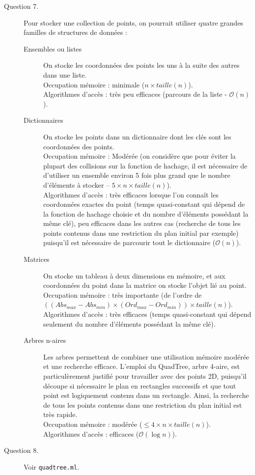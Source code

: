 \documentclass[11pt]{scrartcl}
\newcommand{\filename}[1]{\texttt{\textcolor{darkbrown}{#1}}}
\begin{document}
\begin{description}
\item[Question 7.] Pour stocker une collection de points, on pourrait utiliser quatre grandes familles de structures de données :
\begin{description}
\item[Ensembles ou listes] On stocke les coordonnées des points les uns à la suite des autres dans une liste.\\
Occupation mémoire : minimale ($n \times taille(n)$).\\
Algorithmes d'accès : très peu efficaces (parcours de la liste - $\mathcal{O}(n)$).
\item[Dictionnaires] On stocke les points dans un dictionnaire dont les clés sont les coordonnées des points.\\
Occupation mémoire : Modérée (on considère que pour éviter la plupart des collisions sur la fonction de hachage, il est nécessaire de d'utiliser un ensemble environ 5 fois plus grand que le nombre d'éléments à stocker -- $5 \times n \times taille(n)$).\\
Algorithmes d'accès : très efficaces lorsque l'on connaît les coordonnées exactes du point (temps quasi-constant qui dépend de la fonction de hachage choisie et du nombre d'éléments possédant la même clé), peu efficaces dans les autres cas (recherche de tous les points contenus dans une restriction du plan initial par exemple) puisqu'il est nécessaire de parcourir tout le dictionnaire ($\mathcal{O}(n)$).
\item[Matrices] On stocke un tableau à deux dimensions en mémoire, et aux coordonnées du point dans la matrice on stocke l'objet lié au point.\\
Occupation mémoire : très importante (de l'ordre de $((Abs_{max} - Abs_{min}) \times (Ord_{max} - Ord_{min})) \times taille(n)$).\\
Algorithmes d'accès : très efficaces (temps quasi-constant qui dépend seulement du nombre d'éléments possédant la même clé).
\item[Arbres n-aires] Les arbres permettent de combiner une utilisation mémoire modérée et une recherche efficace. L'emploi du QuadTree, arbre 4-aire, est particulèrement justifié pour travailler avec des points 2D, puisqu'il découpe si nécessaire le plan en rectangles successifs et que tout point est logiquement contenu dans un rectangle. Ainsi, la recherche de tous les points contenus dans une restriction du plan initial est très rapide.\\
Occupation mémoire : modérée ($\leq 4 \times n \times taille(n)$).\\
Algorithmes d'accès : efficaces ($\mathcal{O}(\log{}n)$).
\end{description}
\item[Question 8.] Voir \filename{quadtree.ml}.


\end{description}
\end{document}
